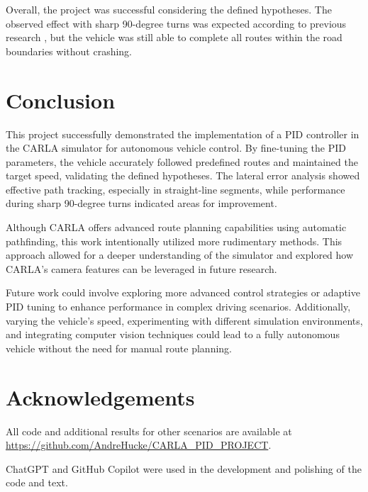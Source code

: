 \documentclass[conference]{IEEEtran}
\begin{document}
Overall, the project was successful considering the defined hypotheses. The observed effect with sharp 90-degree turns was expected according to previous research \cite{10.25165/j.ijabe.20241701.7296}, but the vehicle was still able to complete all routes within the road boundaries without crashing.

\section{Conclusion}

This project successfully demonstrated the implementation of a PID controller in the CARLA simulator for autonomous vehicle control. By fine-tuning the PID parameters, the vehicle accurately followed predefined routes and maintained the target speed, validating the defined hypotheses. The lateral error analysis showed effective path tracking, especially in straight-line segments, while performance during sharp 90-degree turns indicated areas for improvement.

Although CARLA offers advanced route planning capabilities using automatic pathfinding, this work intentionally utilized more rudimentary methods. This approach allowed for a deeper understanding of the simulator and explored how CARLA's camera features can be leveraged in future research.

Future work could involve exploring more advanced control strategies or adaptive PID tuning to enhance performance in complex driving scenarios. Additionally, varying the vehicle's speed, experimenting with different simulation environments, and integrating computer vision techniques could lead to a fully autonomous vehicle without the need for manual route planning.

\section{Acknowledgements}

All code and additional results for other scenarios are available at \url{https://github.com/AndreHucke/CARLA_PID_PROJECT}.

ChatGPT and GitHub Copilot were used in the development and polishing of the code and text.



\end{document}
